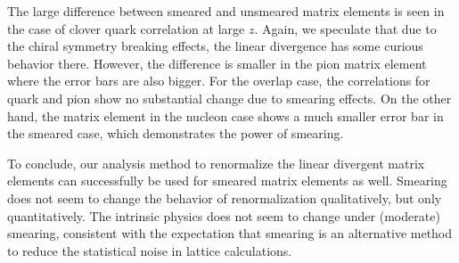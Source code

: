 The large difference between smeared and unsmeared matrix
elements is seen in the case of clover quark correlation 
at large $z$. 
Again, we speculate that due to the chiral symmetry breaking effects, the linear divergence has some curious behavior there. However, the difference is smaller in the pion matrix element where the error bars are also bigger. For the overlap case, 
the correlations for quark and pion show no substantial change 
due to smearing effects. On the other hand, the matrix
element in the nucleon case shows a much smaller 
error bar in the smeared case, which demonstrates the power 
of smearing. 

To conclude, our analysis method to renormalize
the linear divergent matrix elements can successfully be used
for smeared matrix elements as well. Smearing does not seem to change the behavior of renormalization qualitatively, but only quantitatively. 
The intrinsic physics does not seem to change under (moderate) smearing,
consistent with the expectation that smearing is an alternative method to reduce the statistical noise in lattice calculations.
